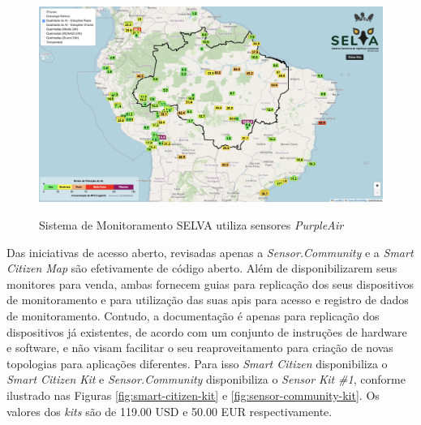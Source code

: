 \begin{figure}[h]
    \centering
    \caption{Sistema de Monitoramento SELVA utiliza sensores \textit{PurpleAir}}
    \includegraphics[width=\textwidth]{chapters/1-MONITORAMENTO/Figuras/SELVA.png}
    \label{fig:selva-purple-air}
\end{figure}

Das iniciativas de acesso aberto, revisadas apenas a \textit{Sensor.Community} e a \textit{Smart Citizen Map} são efetivamente de código aberto. Além de disponibilizarem seus monitores para venda, ambas fornecem guias para replicação dos seus dispositivos de monitoramento e para utilização das suas \acrshort{api}s para acesso e registro de dados de monitoramento. Contudo, a documentação é apenas para replicação dos dispositivos já existentes, de acordo com um conjunto de instruções de hardware e software, e não visam facilitar o seu reaproveitamento para criação de novas topologias para aplicações diferentes. Para isso \textit{Smart Citizen} disponibiliza o \textit{Smart Citizen Kit} e \textit{Sensor.Community} disponibiliza o \textit{Sensor Kit \#1}, conforme ilustrado nas Figuras \ref{fig:smart-citizen-kit} e \ref{fig:sensor-community-kit}. Os valores dos \textit{kits} são de 119.00 USD e 50.00 EUR respectivamente.

